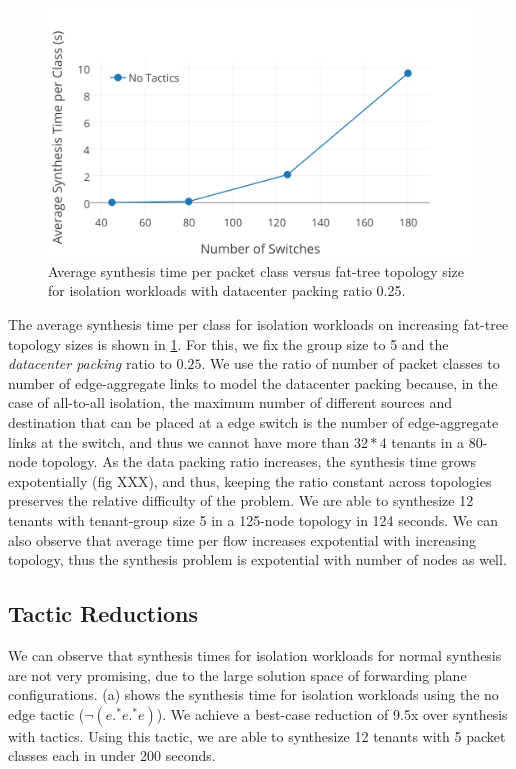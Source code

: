\begin{figure}[H]
		\includegraphics[width=\columnwidth]{figures/no-tactic-topo.png}
		\caption{Average synthesis time per packet class versus fat-tree topology size for isolation workloads with datacenter packing ratio 0.25.}
		\label{fig:no-tactic-topo}
\end{figure}


The average synthesis time per class for isolation workloads
 on increasing fat-tree topology sizes is shown in \cref{fig:no-tactic-topo}. For this, we fix the group size to 5 and
  the {\em datacenter packing} ratio to $0.25$. We use the ratio of number 
  of packet classes to number of edge-aggregate links to model the datacenter 
  packing because, in the case of all-to-all isolation, the maximum number 
  of different sources and destination that can be placed at a edge switch is the number of edge-aggregate links at the switch, and thus we cannot have more than $32*4$ tenants in a 80-node topology. As the data packing ratio increases, the synthesis time grows expotentially (fig XXX), 
  and thus, keeping the ratio constant across topologies preserves the 
  relative difficulty of the problem. We are able to synthesize 12 tenants 
  with tenant-group size 5 in a 125-node topology in 124 seconds. 
  We can also observe that average time per flow increases expotential 
  with increasing topology, thus the synthesis problem is expotential with number of nodes as well. 
		

\subsection{Tactic Reductions}
We can observe that synthesis times for isolation workloads for normal synthesis are not 
very promising, due to the large solution space of forwarding plane configurations.
(a) shows the synthesis time for isolation workloads using the no edge tactic 
($\neg(e .^* e .^* e)$). We achieve a best-case reduction of 9.5x over synthesis with tactics. 
Using this tactic, we are able to synthesize 12 tenants with 5 packet classes each in under 200
seconds.

